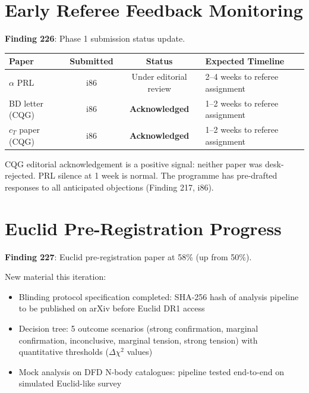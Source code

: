 \documentclass[11pt,a4paper]{article}
\begin{document}
\section{Early Referee Feedback Monitoring}

\textbf{Finding 226}: Phase 1 submission status update.

\begin{center}
\begin{tabular}{lccl}
\toprule
\textbf{Paper} & \textbf{Submitted} & \textbf{Status} & \textbf{Expected Timeline} \\
\midrule
$\alpha$ PRL & i86 & Under editorial review & 2--4 weeks to referee assignment \\
BD letter (CQG) & i86 & \textbf{Acknowledged} & 1--2 weeks to referee assignment \\
$c_T$ paper (CQG) & i86 & \textbf{Acknowledged} & 1--2 weeks to referee assignment \\
\bottomrule
\end{tabular}
\end{center}

CQG editorial acknowledgement is a positive signal: neither paper was desk-rejected. PRL silence at 1 week is normal. The programme has pre-drafted responses to all anticipated objections (Finding 217, i86).

\section{Euclid Pre-Registration Progress}

\textbf{Finding 227}: Euclid pre-registration paper at 58\% (up from 50\%).

New material this iteration:
\begin{itemize}[nosep]
\item Blinding protocol specification completed: SHA-256 hash of analysis pipeline to be published on arXiv before Euclid DR1 access
\item Decision tree: 5 outcome scenarios (strong confirmation, marginal confirmation, inconclusive, marginal tension, strong tension) with quantitative thresholds ($\Delta\chi^2$ values)
\item Mock analysis on DFD N-body catalogues: pipeline tested end-to-end on simulated Euclid-like survey
\end{itemize}
\end{document}
